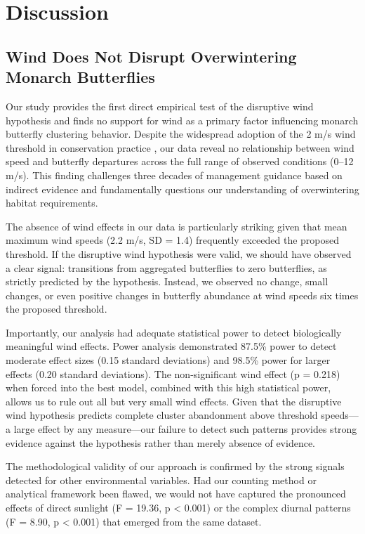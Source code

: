 \section{Discussion}

\subsection{Wind Does Not Disrupt Overwintering Monarch Butterflies}

Our study provides the first direct empirical test of the disruptive wind hypothesis and finds no support for wind as a primary factor influencing monarch butterfly clustering behavior. Despite the widespread adoption of the 2 m/s wind threshold in conservation practice \autocite{xercesGuideWesternMonarch2025}, our data reveal no relationship between wind speed and butterfly departures across the full range of observed conditions (0--12 m/s). This finding challenges three decades of management guidance based on indirect evidence and fundamentally questions our understanding of overwintering habitat requirements.

The absence of wind effects in our data is particularly striking given that mean maximum wind speeds (2.2 m/s, SD = 1.4) frequently exceeded the proposed threshold. If the disruptive wind hypothesis were valid, we should have observed a clear signal: transitions from aggregated butterflies to zero butterflies, as strictly predicted by the hypothesis. Instead, we observed no change, small changes, or even positive changes in butterfly abundance at wind speeds six times the proposed threshold. 

Importantly, our analysis had adequate statistical power to detect biologically meaningful wind effects. Power analysis demonstrated 87.5\% power to detect moderate effect sizes (0.15 standard deviations) and 98.5\% power for larger effects (0.20 standard deviations). The non-significant wind effect (p = 0.218) when forced into the best model, combined with this high statistical power, allows us to rule out all but very small wind effects. Given that the disruptive wind hypothesis predicts complete cluster abandonment above threshold speeds—a large effect by any measure—our failure to detect such patterns provides strong evidence against the hypothesis rather than merely absence of evidence.

The methodological validity of our approach is confirmed by the strong signals detected for other environmental variables. Had our counting method or analytical framework been flawed, we would not have captured the pronounced effects of direct sunlight (F = 19.36, p < 0.001) or the complex diurnal patterns (F = 8.90, p < 0.001) that emerged from the same dataset.

